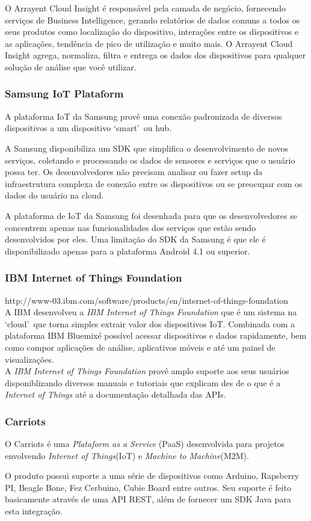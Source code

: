 O Arrayent Cloud Insight é responsável pela camada de negócio, fornecendo serviços de Business Intelligence,
gerando relatórios de dados comuns a todos os seus produtos como localização do dispositivo, interações entre
os dispositivos e as aplicações, tendência de pico de utilização e muito mais. O Arrayent Cloud Insight agrega,
normaliza, filtra e entrega os dados dos dispositivos para qualquer solução de análise que você utilizar.

\subsubsection{Samsung IoT Plataform}
A plataforma IoT da Samsung provê uma conexão padronizada de diversos dispositivos a um dispositivo
\lq smart\rq\ ou hub.

A Samsung disponibiliza um SDK que simplifica o desenvolvimento de novos serviços, coletando
e processando os dados de sensores e serviços que o usuário possa ter. Os desenvolvedores não precisam analisar ou
fazer setup da infraestrutura complexa de conexão entre os dispositivos ou se preocupar com os dados do usuário na cloud.

A plataforma de IoT da Samsung foi desenhada para que os desenvolvedores se concentrem apenas nas funcionalidades
dos serviços que estão sendo desenvolvidos por eles. Uma limitação do SDK da Samsung é que ele é disponibilizado
apenas para a plataforma Android 4.1 ou superior.

\subsubsection{IBM Internet of Things Foundation}
http://www-03.ibm.com/software/products/en/internet-of-things-foundation\\
A IBM desenvolveu a \textit{IBM Internet of Things Foundation} que é um sistema na \lq cloud\rq\ que torna simples
extrair valor dos dispositivos IoT. Combinada com a plataforma IBM Bluemix\texttrademark é possível acessar
dispositivos e dados rapidamente, bem como compor aplicações de análise, aplicativos móveis e até um painel
de visualizações.\\

A \textit{IBM Internet of Things Foundation} provê amplo suporte aos seus usuários
disponiblizando diversos manuais e tutoriais que explicam des de o que é a \textit{Internet of Things}
até a documentação detalhada das APIs.

\subsubsection{Carriots}
O Carriots é uma \textit{Plataform as a Service} (PaaS) desenvolvida para projetos envolvendo
\textit{Internet of Things}(IoT) e \textit{Machine to Machine}(M2M).

O produto possui suporte a uma série de dispositivos como Arduino, Rapsberry PI, Beagle Bone,
Fez Cerbuino, Cubie Board entre outros. Seu suporte é feito basicamente através de uma API REST,
além de fornecer um SDK Java para esta integração.

